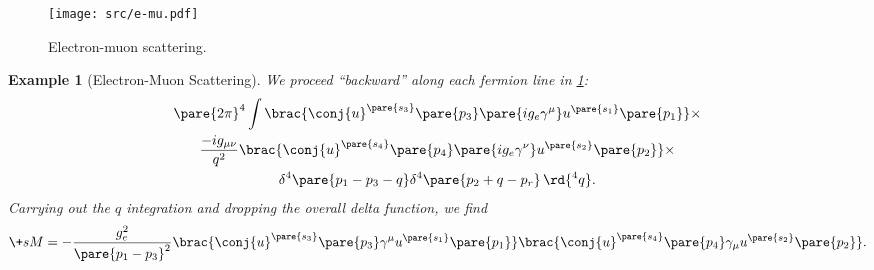 \documentclass[hidelinks]{article}
\newtheorem{example}{Example}
\begin{document}

\begin{figure}[ht]
    \centering
    \texttt{[image: src/e-mu.pdf]}
    \caption{Electron-muon scattering.}
    \label{fig:electron_muon_scattering}
\end{figure}
\begin{sample}
    \begin{example}[Electron-Muon Scattering]
        We proceed ``backward'' along each fermion line in \cref{fig:electron_muon_scattering}:
        \begin{gather*}
            \pare{2\pi}^4 \int \brac{\conj{u}^{\pare{s_3}}\pare{p_3}\pare{ig_e\gamma^\mu}u^{\pare{s_1}}\pare{p_1}}\times \\
            \frac{-ig_{\mu\nu}}{q^2}\brac{\conj{u}^{\pare{s_4}}\pare{p_4}\pare{ig_e \gamma^\nu}u^{\pare{s_2}}\pare{p_2}}\times \\
            \delta^4\pare{p_1 - p_3 - q}\delta^4\pare{p_2 + q - p_r}\,\rd{^4 q}.
        \end{gather*}
        Carrying out the $q$ integration and dropping the overall delta function, we find
        \[ \+sM = -\frac{g_e^2}{\pare{p_1 - p_3}^2}\brac{\conj{u}^{\pare{s_3}}\pare{p_3} \gamma^\mu u^{\pare{s_1}}\pare{p_1}}\brac{\conj{u}^{\pare{s_4}}\pare{p_4}\gamma_\mu u^{\pare{s_2}}\pare{p_2}}. \]
    \end{example}
\end{sample}


\end{document}
